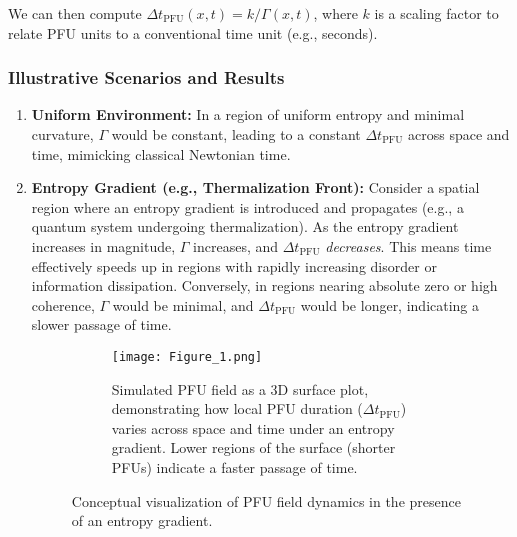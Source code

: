 \documentclass[12pt,a4paper]{article}
\numberwithin{equation}{section}
\begin{document}
We can then compute $\Delta t_{\text{PFU}}(x, t) = k / \Gamma(x, t)$, where $k$ is a scaling factor to relate PFU units to a conventional time unit (e.g., seconds).

\subsubsection{Illustrative Scenarios and Results}
\begin{enumerate}
    \item \textbf{Uniform Environment:} In a region of uniform entropy and minimal curvature, $\Gamma$ would be constant, leading to a constant $\Delta t_{\text{PFU}}$ across space and time, mimicking classical Newtonian time.

    \item \textbf{Entropy Gradient (e.g., Thermalization Front):} Consider a spatial region where an entropy gradient is introduced and propagates (e.g., a quantum system undergoing thermalization). As the entropy gradient increases in magnitude, $\Gamma$ increases, and $\Delta t_{\text{PFU}}$ \textit{decreases}. This means time effectively speeds up in regions with rapidly increasing disorder or information dissipation. Conversely, in regions nearing absolute zero or high coherence, $\Gamma$ would be minimal, and $\Delta t_{\text{PFU}}$ would be longer, indicating a slower passage of time.
    \begin{figure}[H]
    \centering
    \begin{subfigure}[b]{0.8\textwidth}
        \centering
        \texttt{[image: Figure\_1.png]} %
        \caption{Simulated PFU field as a 3D surface plot, demonstrating how local PFU duration ($\Delta t_{\text{PFU}}$) varies across space and time under an entropy gradient. Lower regions of the surface (shorter PFUs) indicate a faster passage of time.}
        \label{fig:pfu_entropy_gradient_surface}
    \end{subfigure}
    \caption{Conceptual visualization of PFU field dynamics in the presence of an entropy gradient.}
    \end{figure}


\end{enumerate}
\end{document}
